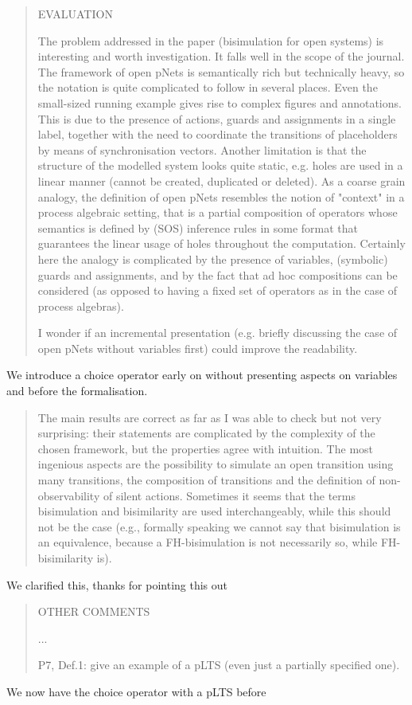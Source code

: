 \documentclass[10pt]{article}
\newenvironment{review}{\bgroup\itshape\begin{quote}}{\end{quote}\egroup}
\begin{document}
\begin{review}
EVALUATION

The problem addressed in the paper (bisimulation for open systems) is interesting
and worth investigation. It falls well in the scope of the journal.
The framework of open pNets is semantically rich but technically heavy, so the notation is quite complicated to follow
in several places. Even the small-sized running example gives rise to complex figures and annotations.
This is due to the presence of actions, guards and assignments in a single label, together with the
need to coordinate the transitions of placeholders by means of synchronisation vectors.
Another limitation is that the structure of the modelled system looks quite static, e.g. holes are used
in a linear manner (cannot be created, duplicated or deleted).
As a coarse grain analogy, the definition of open pNets resembles the notion of "context" in a process
algebraic setting, that is a partial composition of operators whose semantics is defined by (SOS) inference
rules in some format that guarantees the linear usage of holes throughout the computation.
Certainly here the analogy is complicated by the presence of variables, (symbolic) guards and assignments,
and by the fact that ad hoc compositions can be considered (as opposed to having a fixed set of operators
as in the case of process algebras).

I wonder if an incremental presentation (e.g. briefly discussing the case of open pNets without variables first)
could improve the readability.
\end{review}
We introduce a choice operator early on without presenting aspects on variables and before the formalisation.

\begin{review}
The main results are correct as far as I was able to check but not very surprising: their statements are
complicated by the complexity of the chosen framework, but the properties agree with intuition.
The most ingenious aspects are the possibility to simulate an open transition using many transitions,
the composition of transitions and the definition of non-observability of silent actions.
Sometimes it seems that the terms bisimulation and bisimilarity are used interchangeably, while
this should not be the case (e.g., formally speaking we cannot say that bisimulation is an equivalence,
because a FH-bisimulation is not necessarily so, while FH-bisimilarity is).
\end{review}
We clarified this, thanks for pointing this out

\begin{review}
OTHER COMMENTS

...

P7, Def.1: give an example of a pLTS (even just a partially specified one).
\end{review}
We now have the choice operator with a pLTS before
\end{document}
